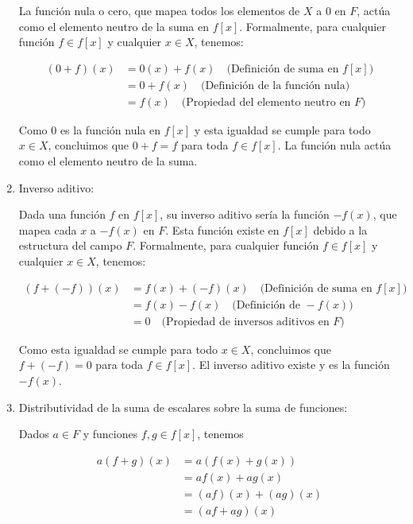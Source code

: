 \begin{enumerate}
    La función nula o cero, que mapea todos los elementos de $X$ a $0$ en $F$, actúa como el elemento neutro de la suma en $f[x]$. Formalmente, para cualquier función $f \in f[x]$ y cualquier $x \in X$, tenemos:
    
    \begin{align*}
        (0 + f)(x) &= 0(x) + f(x) \quad \text{(Definición de suma en } f[x]\text{)} \\
        &= 0 + f(x) \quad \text{(Definición de la función nula)} \\
        &= f(x) \quad \text{(Propiedad del elemento neutro en } F\text{)}
    \end{align*}
    
    Como $0$ es la función nula en $f[x]$ y esta igualdad se cumple para todo $x \in X$, concluimos que $0 + f = f$ para toda $f \in f[x]$. La función nula actúa como el elemento neutro de la suma.

    \item Inverso aditivo:
    
    Dada una función $f$ en $f[x]$, su inverso aditivo sería la función $-f(x)$, que mapea cada $x$ a $-f(x)$ en $F$. Esta función existe en $f[x]$ debido a la estructura del campo $F$. Formalmente, para cualquier función $f \in f[x]$ y cualquier $x \in X$, tenemos:
    
    \begin{align*}
        (f + (-f))(x) &= f(x) + (-f)(x) \quad \text{(Definición de suma en } f[x]\text{)} \\
        &= f(x) - f(x) \quad \text{(Definición de } -f(x)\text{)} \\
        &= 0 \quad \text{(Propiedad de inversos aditivos en } F\text{)}
    \end{align*}
    
    Como esta igualdad se cumple para todo $x \in X$, concluimos que $f + (-f) = 0$ para toda $f \in f[x]$. El inverso aditivo existe y es la función $-f(x)$.
    
    \item Distributividad de la suma de escalares sobre la suma de funciones: 
    
    Dados $a \in F$ y funciones $f, g \in f[x]$, tenemos
    
    \begin{align*}
        a(f + g)(x) &= a(f(x) + g(x)) \\
        &= af(x) + ag(x) \\
        &= (af)(x) + (ag)(x) \\
        &= (af + ag)(x)
    \end{align*}
    

\end{enumerate}
